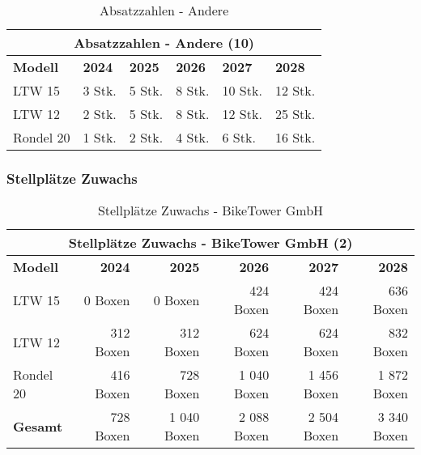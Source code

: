\begin{table}[H]
  \centering
  \begin{tabular}{llllll}
    \multicolumn{6}{c}{\textbf{Absatzzahlen - Andere (10)}}                                         \\
    \toprule
    \textbf{Modell} & \textbf{2024} & \textbf{2025} & \textbf{2026} & \textbf{2027} & \textbf{2028} \\
    \midrule
    LTW 15          & 3 Stk.        & 5 Stk.        & 8 Stk.        & 10 Stk.       & 12 Stk.       \\
    LTW 12          & 2 Stk.        & 5 Stk.        & 8 Stk.        & 12 Stk.       & 25 Stk.       \\
    Rondel 20       & 1 Stk.        & 2 Stk.        & 4 Stk.        & 6 Stk.        & 16 Stk.       \\
    \midrule
  \end{tabular}
  \caption{Absatzzahlen - Andere}
  \label{tab:absatzzahlen_andere}
\end{table}

\subsubsection{Stellplätze Zuwachs}

\begin{table}[H]
  \centering
  \begin{tabular}{lrrrrr}
    \multicolumn{6}{c}{\textbf{Stellplätze Zuwachs - BikeTower GmbH (2)}}                           \\
    \toprule
    \textbf{Modell} & \textbf{2024} & \textbf{2025} & \textbf{2026} & \textbf{2027} & \textbf{2028} \\
    \midrule
    LTW 15          & 0 Boxen       & 0 Boxen       & 424 Boxen     & 424 Boxen     & 636 Boxen     \\
    LTW 12          & 312 Boxen     & 312 Boxen     & 624 Boxen     & 624 Boxen     & 832 Boxen     \\
    Rondel 20       & 416 Boxen     & 728 Boxen     & 1 040 Boxen   & 1 456 Boxen   & 1 872 Boxen   \\
    \midrule
    \textbf{Gesamt} & 728 Boxen     & 1 040 Boxen   & 2 088 Boxen   & 2 504 Boxen   & 3 340 Boxen   \\
    \bottomrule
  \end{tabular}
  \caption{Stellplätze Zuwachs - BikeTower GmbH}
  \label{tab:stellplaetze_zuwachs_biketower}
\end{table}


